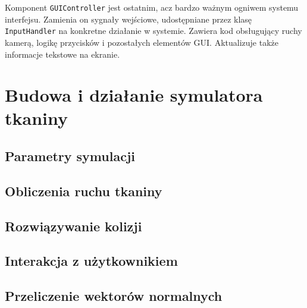 		Komponent \texttt{GUIController} jest ostatnim, acz bardzo ważnym ogniwem systemu interfejsu. Zamienia on sygnały wejściowe, udostępniane przez klasę \texttt{InputHandler} na konkretne działanie w systemie. Zawiera kod obsługujący ruchy kamerą, logikę przycisków i pozostałych elementów GUI. Aktualizuje także informacje tekstowe na ekranie.
	
	\section{Budowa i działanie symulatora tkaniny}
	\label{t:praktyka:symulacja}
	
		\subsection{Parametry symulacji}
		\label{t:praktyka:symulacja:parametry}
		
		\subsection{Obliczenia ruchu tkaniny}
		\label{t:praktyka:symulacja:ruch}
		
		\subsection{Rozwiązywanie kolizji}
		\label{t:praktyka:symulacja:kolizje}
		
		\subsection{Interakcja z użytkownikiem}
		\label{t:praktyka:symulacja:interakcja}
		
		\subsection{Przeliczenie wektorów normalnych}
		\label{t:praktyka:symulacja:normalne}
	
	
	
